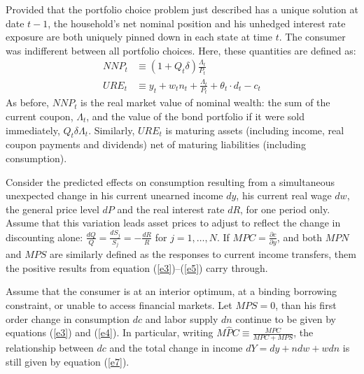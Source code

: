\documentclass[11pt,letterpaper]{article}
\begin{document}
Provided that the portfolio choice problem just described has a unique solution at date $t-1$, the household's net nominal position and his unhedged interest rate exposure are both uniquely pinned down in each state at time $t$. The consumer was indifferent between all portfolio choices. Here, these quantities are defined as: 
\begin{align*}
    NNP_{t} &\equiv (1 + Q_{t}\delta) \frac{\Lambda_{t}}{P_{t}} \\
    URE_{t} &\equiv y_{t} + w_{t}n_{t} + \frac{\Lambda_{t}}{P{_t}} + \theta_{t} \cdot d_{t} - c_{t}
\end{align*}
As before, $NNP_{t}$ is the real market value of nominal wealth: the sum of the current coupon, $\Lambda_{t}$, and the value of the bond portfolio if it were sold immediately, $Q_{t}\delta\Lambda_{t}$. Similarly, $URE_{t}$ is maturing assets (including income, real coupon payments and dividends) net of maturing liabilities (including consumption). 

Consider the predicted effects on consumption resulting from a simultaneous unexpected change in his current unearned income $dy$, his current real wage $dw$, the general price level $dP$ and the real interest rate $dR$, for one period only. Assume that this variation leads asset prices to adjust to reflect the change in discounting alone: $\frac{dQ}{Q} = \frac{dS_{j}}{S_{j}} = - \frac{dR}{R}$ for $j = 1, \ldots, N$. If $MPC = \frac{\partial c}{\partial y}$, and both $MPN$ and $MPS$ are similarly defined as the responses to current income transfers, them the positive results from equation (\ref{e3})--(\ref{e5}) carry through.   

Assume that the consumer is at an interior optimum, at a binding borrowing constraint, or unable to access financial markets. Let $MPS = 0$, than his first order change in consumption $dc$ and labor supply $dn$ continue to be given by equations (\ref{e3}) and (\ref{e4}). In particular, writing $M\widehat{P}C \equiv \frac{MPC}{MPC + MPS}$, the relationship between $dc$ and the total change in income $dY = dy + ndw + wdn$ is still given by equation (\ref{e7}). 
\end{document}
